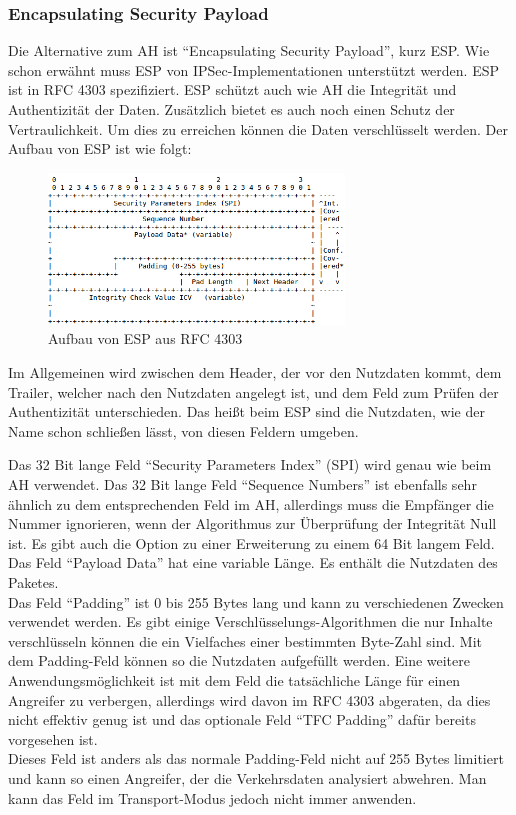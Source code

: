 \documentclass[12pt]{scrartcl}
\begin{document}
\subsubsection{Encapsulating Security Payload}
Die Alternative zum AH ist "`Encapsulating Security Payload"', kurz ESP. Wie schon erwähnt muss ESP von IPSec-Implementationen unterstützt werden. ESP ist in RFC 4303 spezifiziert.\cite{RFC4303}
ESP schützt auch wie AH die Integrität und Authentizität der Daten. Zusätzlich bietet es auch noch einen Schutz der Vertraulichkeit. Um dies zu erreichen können die Daten verschlüsselt werden. Der Aufbau von ESP ist wie folgt:
\begin{figure}[htbp] 
  \centering
     \includegraphics[width=0.7\textwidth]{ESP-Aufbau.png}
  \caption{Aufbau von ESP aus RFC 4303}
  \label{AH-Aufbau}
\end{figure}
Im Allgemeinen wird zwischen dem Header, der vor den Nutzdaten kommt, dem Trailer, welcher nach den Nutzdaten angelegt ist, und dem Feld zum Prüfen der Authentizität unterschieden. Das heißt beim ESP sind die Nutzdaten, wie der Name schon schließen lässt, von diesen Feldern umgeben.

Das 32 Bit lange Feld "`Security Parameters Index"' (SPI) wird genau wie beim AH verwendet. Das 32 Bit lange Feld "`Sequence Numbers"' ist ebenfalls sehr ähnlich zu dem entsprechenden Feld im AH, allerdings muss die Empfänger die Nummer ignorieren, wenn der Algorithmus zur Überprüfung der Integrität Null ist. Es gibt auch die Option zu einer Erweiterung zu einem 64 Bit langem Feld.\\
Das Feld "`Payload Data"' hat eine variable Länge. Es enthält die Nutzdaten des Paketes.\\ 
Das Feld "`Padding"' ist 0 bis 255 Bytes lang und kann zu verschiedenen Zwecken verwendet werden. Es gibt einige Verschlüsselungs-Algorithmen die nur Inhalte verschlüsseln können die ein Vielfaches einer bestimmten Byte-Zahl sind. Mit dem Padding-Feld können so die Nutzdaten aufgefüllt werden. Eine weitere Anwendungsmöglichkeit ist mit dem Feld die tatsächliche Länge für einen Angreifer zu verbergen, allerdings wird davon im RFC 4303 abgeraten, da dies nicht effektiv genug ist und das optionale Feld "`TFC Padding"' dafür bereits vorgesehen ist.\cite{RFC4303}\\ 
Dieses Feld ist anders als das normale Padding-Feld nicht auf 255 Bytes limitiert und kann so einen Angreifer, der die Verkehrsdaten analysiert abwehren. Man kann das Feld im Transport-Modus jedoch nicht immer anwenden. 
\end{document}
